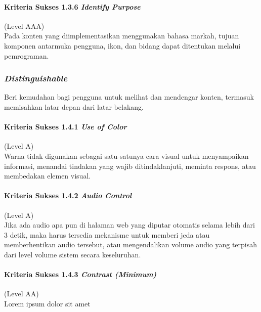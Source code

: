 \paragraph{Kriteria Sukses 1.3.6 \textit{Identify Purpose}}
\label{sec:kriteria_sukses_1.3.6}
(Level AAA)\\

Pada konten yang diimplementasikan menggunakan bahasa markah, tujuan komponen antarmuka pengguna, ikon, dan bidang dapat ditentukan melalui pemrograman.

\subsubsection{\textit{Distinguishable}}
\label{sec:distinguishable}
Beri kemudahan bagi pengguna untuk melihat dan mendengar konten, termasuk memisahkan latar depan dari latar belakang.

\paragraph{Kriteria Sukses 1.4.1 \textit{Use of Color}}
\label{sec:kriteria_sukses_1.4.1}
(Level A)\\

Warna tidak digunakan sebagai satu-satunya cara visual untuk menyampaikan informasi, menandai tindakan yang wajib ditindaklanjuti, meminta respons, atau membedakan elemen visual.

\paragraph{Kriteria Sukses 1.4.2 \textit{Audio Control}}
\label{sec:kriteria_sukses_1.4.2}
(Level A)\\

Jika ada audio apa pun di halaman web yang diputar otomatis selama lebih dari 3 detik, maka harus tersedia mekanisme untuk memberi jeda atau memberhentikan audio tersebut, atau mengendalikan volume audio yang terpisah dari level volume sistem secara keseluruhan.

\paragraph{Kriteria Sukses 1.4.3 \textit{Contrast (Minimum)}}
\label{sec:kriteria_sukses_1.4.3}
(Level AA)\\

Lorem ipsum dolor sit amet

